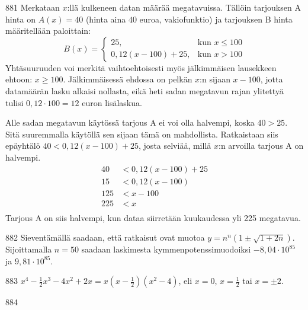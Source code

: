 \begin{Vastaus}{881}
	Merkataan $x$:llä kulkeneen datan määrää megatavuissa. Tällöin tarjouksen A hinta on $A(x)=40$ (hinta aina $40$ euroa, vakiofunktio) ja tarjouksen B hinta määritellään paloittain:
	$$B(x)=\begin{cases}
	25, & \mbox{kun } x\leq 100 \\
	0,12(x-100)+25, & \mbox{kun } x>100
	\end{cases}$$
Yhtäsuuruuden voi merkitä vaihtoehtoisesti myös jälkimmäisen lausekkeen ehtoon: $x\geq 100$. Jälkimmäisessä ehdossa on pelkän $x$:n sijaan $x-100$, jotta datamäärän lasku alkaisi nollasta, eikä heti sadan megatavun rajan ylitettyä tulisi $0,12\cdot 100=12$ euron lisälaskua.

Alle sadan megatavun käytössä tarjous A ei voi olla halvempi, koska $40>25$. Sitä suuremmalla käytöllä sen sijaan tämä on mahdollista. Ratkaistaan siis epäyhtälö $40<0,12(x-100)+25$, josta selviää, millä $x$:n arvoilla tarjous A on halvempi.
\begin{align*}
40&<0,12(x-100)+25 \\
15 &<0,12(x-100) \\
125&<x-100 \\
225&<x \\
\end{align*}
	Tarjous A on siis halvempi, kun dataa siirretään kuukaudessa yli 225 megatavua.
	
\end{Vastaus}
\begin{Vastaus}{882}
	Sieventämällä saadaan, että ratkaisut ovat muotoa $y=n^n (1\pm \sqrt{1+2n})$. Sijoittamalla $n=50$ saadaan laskimesta kymmenpotenssimuodoiksi $-8,04\cdot 10^{85}$ ja $9,81\cdot 10^{85}$.
	
\end{Vastaus}
\begin{Vastaus}{883}
$x^4-\frac{1}{2}x^3-4x^2+2x=x(x-\frac{1}{2})(x^2-4)$, eli $x=0$, $x=\frac{1}{2}$ tai $x=\pm 2$.
	
\end{Vastaus}
\begin{Vastaus}{884}
		
\end{Vastaus}
